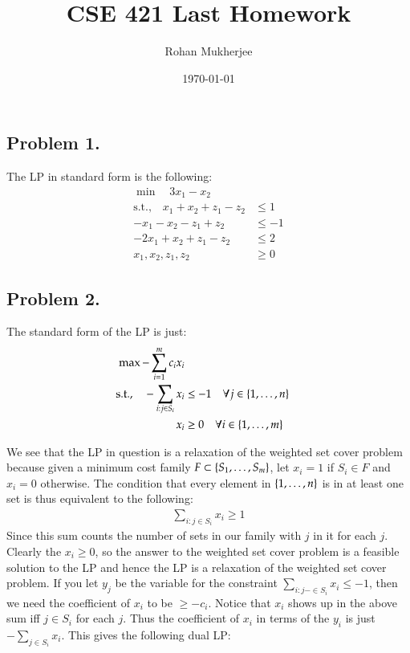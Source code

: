 \documentclass[12pt]{article}
\title{CSE 421 Last Homework}
\date{\today}
\author{Rohan Mukherjee}
\theoremstyle{definitionstyle}
\newcommand{\SET}[1]{\Set{\mskip-\medmuskip #1 \mskip-\medmuskip}}
\begin{document}
    \maketitle
    \subsection*{Problem 1.}
    The LP in standard form is the following:
    \begin{align*}
        \min \quad  3x_1 - x_2 \\
        \text{s.t.,} \quad x_1+x_2+z_1 - z_2 &\leq 1 \\
        -x_1-x_2-z_1+z_2 &\leq -1 \\
        -2x_1 + x_2 + z_1 - z_2 &\leq 2 \\
        x_1, x_2, z_1, z_2 &\geq 0
    \end{align*}

    \subsection*{Problem 2.}

    The standard form of the LP is just:
    \begin{align*}
        \max -\sum_{i=1}^m c_ix_i \\ 
        \text{s.t.,} \quad -\sum_{i: j \in S_i} x_i & \leq -1 \quad \forall j \in \SET{1, \ldots, n} \\
        x_i &\geq 0 \quad \forall i \in \SET{1, \ldots, m}
    \end{align*}

    We see that the LP in question is a relaxation of the weighted set cover problem because given a minimum cost family $F \subset \SET{S_1, \ldots, S_m}$, let $x_i = 1$ if $S_i \in F$ and $x_i = 0$ otherwise. The condition that every element in $\SET{1, \ldots, n}$ is in at least one set is thus equivalent to the following:
    \begin{align*}
        \sum_{i : j \in S_i} x_i \geq 1
    \end{align*}
    Since this sum counts the number of sets in our family with $j$ in it for each $j$. Clearly the $x_i \geq 0$, so the answer to the weighted set cover problem is a feasible solution to the LP and hence the LP is a relaxation of the weighted set cover problem. If you let $y_j$ be the variable for the constraint $\sum_{i: j -\in S_i} x_i \leq -1$, then we need the coefficient of $x_i$ to be $\geq -c_i$. Notice that $x_i$ shows up in the above sum iff $j \in S_i$ for each $j$. Thus the coefficient of $x_i$ in terms of the $y_i$ is just $-\sum_{j \in S_i} x_i$. This gives the following dual LP:
\end{document}
